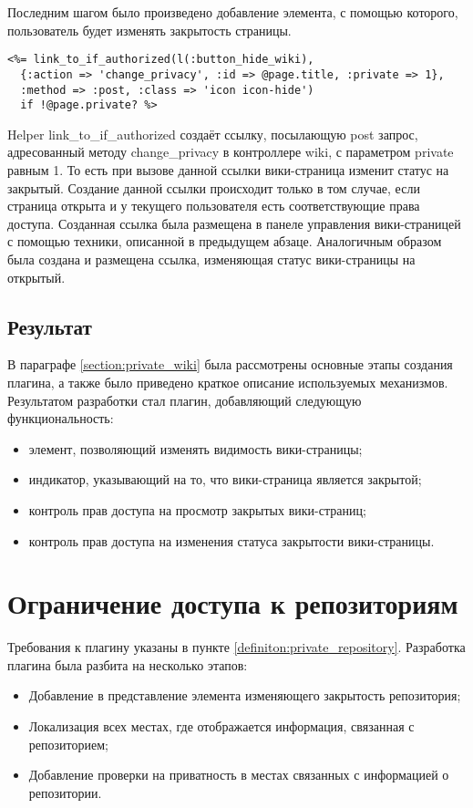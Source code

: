Последним шагом было произведено добавление элемента, с помощью которого,
пользователь будет изменять закрытость страницы.
\small{\begin{lstlisting}
<%= link_to_if_authorized(l(:button_hide_wiki), 
  {:action => 'change_privacy', :id => @page.title, :private => 1}, 
  :method => :post, :class => 'icon icon-hide') 
  if !@page.private? %>
\end{lstlisting}}
Helper link\_to\_if\_authorized создаёт ссылку, посылающую post запрос,
адресованный методу change\_privacy в контроллере wiki, с параметром private
равным 1. То есть при вызове данной ссылки вики-страница изменит статус на
закрытый. Создание данной ссылки происходит только в том случае, если страница
открыта и у текущего пользователя есть соответствующие права доступа. Созданная
ссылка была размещена в панеле управления вики-страницей с помощью техники,
описанной в предыдущем абзаце. Аналогичным образом была создана и размещена
ссылка, изменяющая статус вики-страницы на открытый.

\subsection{Результат}
В параграфе \ref{section:private_wiki} была рассмотрены основные этапы создания
плагина, а также было приведено краткое описание используемых механизмов.
Результатом разработки стал плагин, добавляющий следующую функциональность:
\begin{itemize}
  \item элемент, позволяющий изменять видимость вики-страницы;
  \item индикатор, указывающий на то, что вики-страница является закрытой;
  \item контроль прав доступа на просмотр закрытых вики-страниц;
  \item контроль прав доступа на изменения статуса закрытости вики-страницы.
\end{itemize}

\section{Ограничение доступа к репозиториям}
Требования к плагину указаны в пункте \ref{definiton:private_repository}.
Разработка плагина была разбита на несколько этапов:
\begin{itemize}
  \item Добавление в представление элемента изменяющего закрытость репозитория;
  \item Локализация всех местах, где отображается информация, связанная с
  репозиторием;
  \item Добавление проверки на приватность в местах связанных с
  информацией о репозитории.
\end{itemize}

